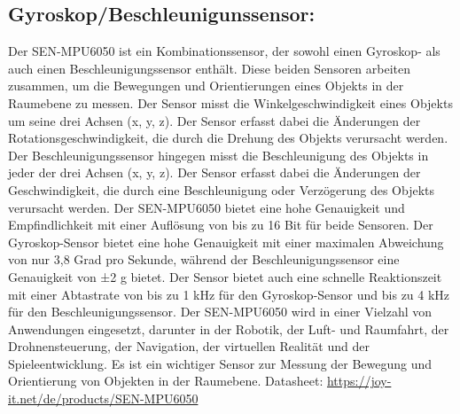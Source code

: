 \subsection*{Gyroskop/Beschleunigunssensor:}
Der SEN-MPU6050 ist ein Kombinationssensor, der sowohl einen Gyroskop- als auch einen Beschleunigungssensor enthält. 
Diese beiden Sensoren arbeiten zusammen, um die Bewegungen und Orientierungen eines Objekts in der Raumebene zu messen. 
Der Sensor misst die Winkelgeschwindigkeit eines Objekts um seine drei Achsen (x, y, z). Der Sensor erfasst dabei die Änderungen der Rotationsgeschwindigkeit, die durch die Drehung des Objekts verursacht werden. 
Der Beschleunigungssensor hingegen misst die Beschleunigung des Objekts in jeder der drei Achsen (x, y, z). 
Der Sensor erfasst dabei die Änderungen der Geschwindigkeit, die durch eine Beschleunigung oder Verzögerung des Objekts verursacht werden. 
Der SEN-MPU6050 bietet eine hohe Genauigkeit und Empfindlichkeit mit einer Auflösung von bis zu 16 Bit für beide Sensoren. 
Der Gyroskop-Sensor bietet eine hohe Genauigkeit mit einer maximalen Abweichung von nur 3,8 Grad pro Sekunde, während der Beschleunigungssensor eine Genauigkeit von ±2 g bietet. 
Der Sensor bietet auch eine schnelle Reaktionszeit mit einer Abtastrate von bis zu 1 kHz für den Gyroskop-Sensor und bis zu 4 kHz für den Beschleunigungssensor. 
Der SEN-MPU6050 wird in einer Vielzahl von Anwendungen eingesetzt, darunter in der Robotik, der Luft- und Raumfahrt, der Drohnensteuerung, der Navigation, der virtuellen Realität und der Spieleentwicklung. 
Es ist ein wichtiger Sensor zur Messung der Bewegung und Orientierung von Objekten in der Raumebene. 
\newline
Datasheet: \url{https://joy-it.net/de/products/SEN-MPU6050} 




